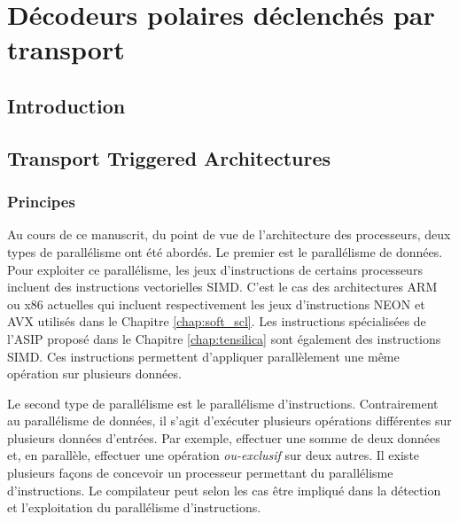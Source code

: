 \chapter{Décodeurs polaires déclenchés par transport} %
\label{chap:tta}

\vspace*{\fill}
\minitocTITI
\vspace*{\fill}
\newpage

\section*{Introduction}



\section{Transport Triggered Architectures}


\subsection{Principes}

Au cours de ce manuscrit, du point de vue de l'architecture des processeurs, deux types de parallélisme ont été abordés.
Le premier est le parallélisme de données.
Pour exploiter ce parallélisme, les jeux d'instructions de certains processeurs incluent des instructions vectorielles SIMD.
C'est le cas des architectures ARM ou x86 actuelles qui incluent respectivement les jeux d'instructions NEON et AVX utilisés dans le Chapitre \ref{chap:soft_scl}.
Les instructions spécialisées de l'ASIP proposé dans le Chapitre \ref{chap:tensilica} sont également des instructions SIMD.
Ces instructions permettent d'appliquer parallèlement une même opération sur plusieurs données.

Le second type de parallélisme est le parallélisme d'instructions. Contrairement au parallélisme de données, il s'agit d'exécuter plusieurs opérations différentes sur plusieurs données d'entrées. Par exemple, effectuer une somme de deux données et, en parallèle, effectuer une opération \textit{ou-exclusif} sur deux autres.
Il existe plusieurs façons de concevoir un processeur permettant du parallélisme d'instructions. Le compilateur peut selon les cas être impliqué dans la détection et l'exploitation du parallélisme d'instructions.

